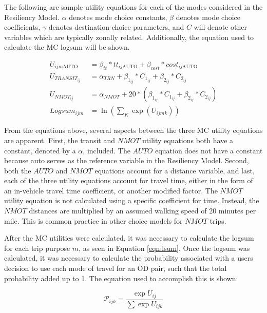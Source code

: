 The following are sample utility equations for each of the modes considered in
the Resiliency Model. $\alpha$ denotes mode choice constants, $\beta$ denotes
mode choice coefficients, $\gamma$ denotes destination choice parameters, and
$C$ will denote other variables which are typically zonally related. Additionally,
the equation used to calculate the MC logsum will be shown.


\begin{align}
U_{ijm\mathrm{AUTO}} &= \beta_{tt} * tt_{ij\mathrm{AUTO}} + \beta_{cost}* cost_{ij\mathrm{AUTO}}\\
U_{{TRANSIT}_{ij}} &= \alpha_{TRN} + \beta_{1_{ij}} * C_{1_{ij}} + \beta_{2_{ij}} * C_{2_{ij}}\\
U_{{NMOT}_{ij}} &= \alpha_{NMOT} + 20 * (\beta_{1_{ij}} * C_{1_{ij}} + \beta_{2_{ij}} * C_{2_{ij}})\\
Logsum_{ijm} &= \ln(\sum_K \exp (U_{ijmk})) \label{eqn:lsum}
\end{align}

From the equations above, several aspects between the three MC utility equations are
apparent. First, the transit and $NMOT$ utility equations both have a constant, denoted by a $\alpha$,
included. The $AUTO$ equation does not have a constant because auto serves as the reference
variable in the Resiliency Model. Second, both the $AUTO$ and $NMOT$ equations account for a
distance variable, and last, each of the three utility equations account for travel time, either in the
form of an in-vehicle travel time coefficient, or another modified factor. The $NMOT$ utility
equation is not calculated using a specific coefficient for time. Instead, the $NMOT$ distances are
multiplied by an assumed walking speed of 20 minutes per mile. This is common practice in other
choice models for $NMOT$ trips.

After the MC utilities were calculated, it was necessary to calculate the logsum for
each trip purpose \(m\), as seen in Equation \ref{eqn:lsum}. Once the logsum was calculated,
it was necessary to calculate the probability associated with a users decision to use
each mode of travel for an OD pair, such that the total probability added
up to 1. The equation used to accomplish this is shown:

\begin{equation}
	\mathcal{P}_{ijk} = \frac{\exp U_{ij}}{\sum \exp U_{ijk}}
	\label{eqn:prob}
\end{equation}

